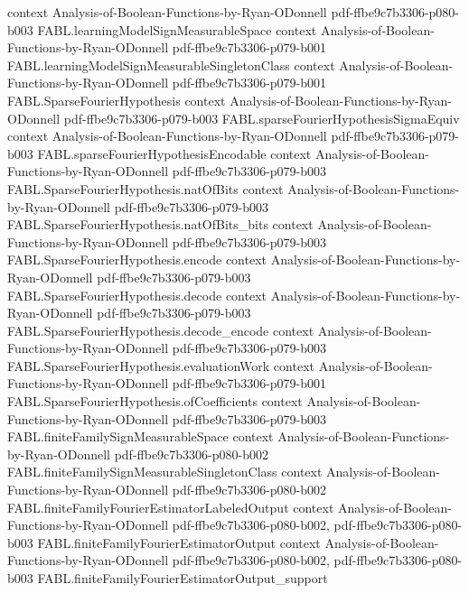 \begin{theorem}
  {context}
  {Analysis-of-Boolean-Functions-by-Ryan-ODonnell}
  {pdf-ffbe9c7b3306-p080-b003}
\proofstep
  {FABL.learningModelSignMeasurableSpace}
  {context}
  {Analysis-of-Boolean-Functions-by-Ryan-ODonnell}
  {pdf-ffbe9c7b3306-p079-b001}
\proofstep
  {FABL.learningModelSignMeasurableSingletonClass}
  {context}
  {Analysis-of-Boolean-Functions-by-Ryan-ODonnell}
  {pdf-ffbe9c7b3306-p079-b001}
\proofstep
  {FABL.SparseFourierHypothesis}
  {context}
  {Analysis-of-Boolean-Functions-by-Ryan-ODonnell}
  {pdf-ffbe9c7b3306-p079-b003}
\proofstep
  {FABL.sparseFourierHypothesisSigmaEquiv}
  {context}
  {Analysis-of-Boolean-Functions-by-Ryan-ODonnell}
  {pdf-ffbe9c7b3306-p079-b003}
\proofstep
  {FABL.sparseFourierHypothesisEncodable}
  {context}
  {Analysis-of-Boolean-Functions-by-Ryan-ODonnell}
  {pdf-ffbe9c7b3306-p079-b003}
\proofstep
  {FABL.SparseFourierHypothesis.natOfBits}
  {context}
  {Analysis-of-Boolean-Functions-by-Ryan-ODonnell}
  {pdf-ffbe9c7b3306-p079-b003}
\proofstep
  {FABL.SparseFourierHypothesis.natOfBits_bits}
  {context}
  {Analysis-of-Boolean-Functions-by-Ryan-ODonnell}
  {pdf-ffbe9c7b3306-p079-b003}
\proofstep
  {FABL.SparseFourierHypothesis.encode}
  {context}
  {Analysis-of-Boolean-Functions-by-Ryan-ODonnell}
  {pdf-ffbe9c7b3306-p079-b003}
\proofstep
  {FABL.SparseFourierHypothesis.decode}
  {context}
  {Analysis-of-Boolean-Functions-by-Ryan-ODonnell}
  {pdf-ffbe9c7b3306-p079-b003}
\proofstep
  {FABL.SparseFourierHypothesis.decode_encode}
  {context}
  {Analysis-of-Boolean-Functions-by-Ryan-ODonnell}
  {pdf-ffbe9c7b3306-p079-b003}
\proofstep
  {FABL.SparseFourierHypothesis.evaluationWork}
  {context}
  {Analysis-of-Boolean-Functions-by-Ryan-ODonnell}
  {pdf-ffbe9c7b3306-p079-b001}
\proofstep
  {FABL.SparseFourierHypothesis.ofCoefficients}
  {context}
  {Analysis-of-Boolean-Functions-by-Ryan-ODonnell}
  {pdf-ffbe9c7b3306-p079-b003}
\proofstep
  {FABL.finiteFamilySignMeasurableSpace}
  {context}
  {Analysis-of-Boolean-Functions-by-Ryan-ODonnell}
  {pdf-ffbe9c7b3306-p080-b002}
\proofstep
  {FABL.finiteFamilySignMeasurableSingletonClass}
  {context}
  {Analysis-of-Boolean-Functions-by-Ryan-ODonnell}
  {pdf-ffbe9c7b3306-p080-b002}
\proofstep
  {FABL.finiteFamilyFourierEstimatorLabeledOutput}
  {context}
  {Analysis-of-Boolean-Functions-by-Ryan-ODonnell}
  {pdf-ffbe9c7b3306-p080-b002,
    pdf-ffbe9c7b3306-p080-b003}
\proofstep
  {FABL.finiteFamilyFourierEstimatorOutput}
  {context}
  {Analysis-of-Boolean-Functions-by-Ryan-ODonnell}
  {pdf-ffbe9c7b3306-p080-b002,
    pdf-ffbe9c7b3306-p080-b003}
\proofstep
  {FABL.finiteFamilyFourierEstimatorOutput_support}

\end{theorem}

